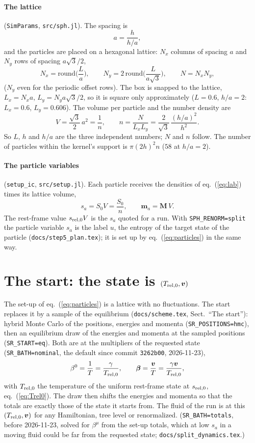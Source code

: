 \documentclass[11pt,aps,preprint,nofootinbib,superscriptaddress,tightenlines]{revtex4-2}
\def\st{\begin{equation}}
\def\stp{\end{equation}}
\def\Eq#1{eq.~(\ref{#1})}
\let\oldparagraph\paragraph
\renewcommand{\paragraph}{\par\bigskip\oldparagraph}
\begin{document}
\paragraph{The lattice} (\texttt{SimParams}, \texttt{src/sph.jl}).  The spacing is
\st
a=\frac{h}{h/a},
\stp
and the particles are placed on a hexagonal lattice: $N_x$ columns of spacing $a$ and $N_y$ rows of spacing $a\sqrt3/2$,
\st
N_x=\mathrm{round}\Big(\frac La\Big),\qquad N_y=2\,\mathrm{round}\Big(\frac{L}{a\sqrt3}\Big),\qquad N=N_xN_y ,
\stp
($N_y$ even for the periodic offset rows).  The box is snapped to the lattice, $L_x=N_xa$, $L_y=N_ya\sqrt3/2$, so it is square only
approximately ($L=0.6$, $h/a=2$: $L_x=0.6$, $L_y=0.606$).  The volume per particle and the number density are
\st
V=\frac{\sqrt3}{2}\,a^2=\frac1n,\qquad n=\frac{N}{L_xL_y}=\frac{2}{\sqrt3}\,\frac{(h/a)^2}{h^2} .
\label{eq:n}
\stp
So $L$, $h$ and $h/a$ are the three independent numbers; $N$ and $n$ follow.  The number of particles within the kernel's support is
$\pi(2h)^2n$ ($58$ at $h/a=2$).

\paragraph{The particle variables} (\texttt{setup\_ic}, \texttt{src/setup.jl}).  Each particle receives the densities of \Eq{eq:lab}
times its lattice volume,
\st
s_a=S_0V=\frac{S_0}{n},\qquad \bm m_a=\bm M\,V .
\label{eq:particles}
\stp
The rest-frame value $s_{\rm rel,0}V$ is the $s_a$ quoted for a run.  With \texttt{SPH\_RENORM=split} the particle variable $s_a$ is the label
$u$, the entropy of the target state of the particle (\texttt{docs/step5\_plan.tex}); it is set up by \Eq{eq:particles} in the same way.

\section{\texorpdfstring{The start: the state is $(T_{\rm rel,0},\bm v)$}{The start}}
\label{sec:start}

The set-up of \Eq{eq:particles} is a lattice with no fluctuations.  The start replaces it by a sample of the equilibrium
(\texttt{docs/scheme.tex}, Sect.~``The start''): hybrid Monte Carlo of the positions, energies and momenta (\texttt{SR\_POSITIONS=hmc}),
then an equilibrium draw of the energies and momenta at the sampled positions (\texttt{SR\_START=eq}).  Both are at the multipliers
of the requested state (\texttt{SR\_BATH=nominal}, the default since commit \texttt{3262b00}, 2026-11-23),
\st
\beta^0=\frac1T=\frac{\gamma}{T_{\rm rel,0}},\qquad \bm\beta=\frac{\bm v}{T}=\frac{\gamma\bm v}{T_{\rm rel,0}} ,
\label{eq:bath}
\stp
with $T_{\rm rel,0}$ the temperature of the uniform rest-frame state at $s_{\rm rel,0}$, \Eq{eq:Trel0}.  The draw then shifts the energies and momenta
so that the totals are exactly those of the state it starts from.  The fluid of the run is at this $(T_{\rm rel,0},\bm v)$ for any
Hamiltonian, tree level or renormalized.  (\texttt{SR\_BATH=totals}, before 2026-11-23, solved for $\beta^\mu$ from the set-up totals,
which at low $s_a$ in a moving fluid could be far from the requested state; \texttt{docs/split\_dynamics.tex}.)
\end{document}
